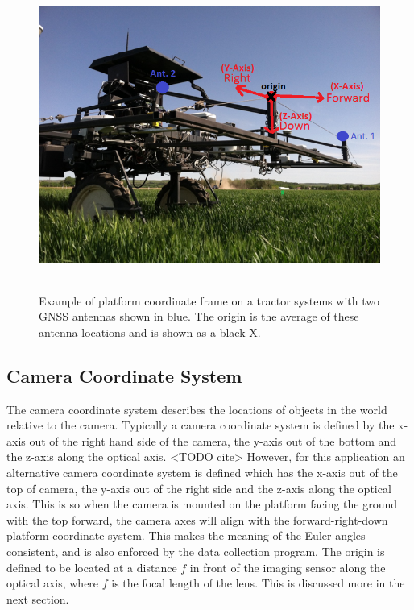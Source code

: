 \begin{figure}[tbh]
	\centering
    \includegraphics[height=4in]{figures/platform_frame_2_gps.png}
    \caption[Platform coordinate frame]{Example of platform coordinate frame on a tractor systems with two GNSS antennas shown in blue. The origin is the average of these antenna locations and is shown as a black X.}
    \label{platform_frame}
\end{figure}

\subsection{Camera Coordinate System}

The camera coordinate system describes the locations of objects in the world relative to the camera.  Typically a camera coordinate system is defined by the x-axis out of the right hand side of the camera, the y-axis out of the bottom and the z-axis along the optical axis.  <TODO cite>   However, for this application an alternative camera coordinate system is defined which has the x-axis out of the top of camera, the y-axis out of the right side and the z-axis along the optical axis.  This is so when the camera is mounted on the platform facing the ground with the top forward, the camera axes will align with the forward-right-down platform coordinate system.  This makes the meaning of the Euler angles consistent, and is also enforced by the data collection program.  The origin is defined to be located at a distance $f$ in front of the imaging sensor along the optical axis, where $f$ is the focal length of the lens.  This is discussed more in the next section.

